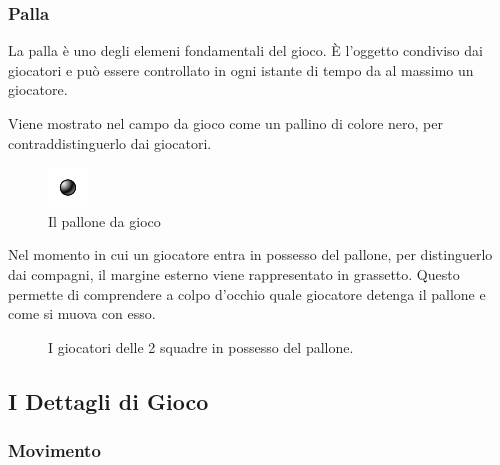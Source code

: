 \documentclass[aps,letterpaper,10pt]{article}
\begin{document}
\subsubsection{Palla}

La palla \`e uno degli elemeni fondamentali del gioco. \`E l'oggetto condiviso dai giocatori e pu\`o essere controllato in ogni istante di tempo da al massimo un giocatore. \vspace{3mm}

Viene mostrato nel campo da gioco come un pallino di colore nero, per contraddistinguerlo dai giocatori.

\begin{figure}[H]
	\begin{center}
		\includegraphics[width=40px]{images/ball.pdf}
	\end{center}
\caption{Il pallone da gioco}
\end{figure}

Nel momento in cui un giocatore entra in possesso del pallone, per distinguerlo dai compagni, il margine esterno viene rappresentato in grassetto. Questo permette di comprendere a colpo d'occhio quale giocatore detenga il pallone e come si muova con esso.

\begin{figure}[H]
  \centering
    \hspace{1cm}             
  \caption{I giocatori delle 2 squadre in possesso del pallone.}
\end{figure}

\subsection{I Dettagli di Gioco}

\subsubsection{Movimento}
\label{movimento}
\end{document}

